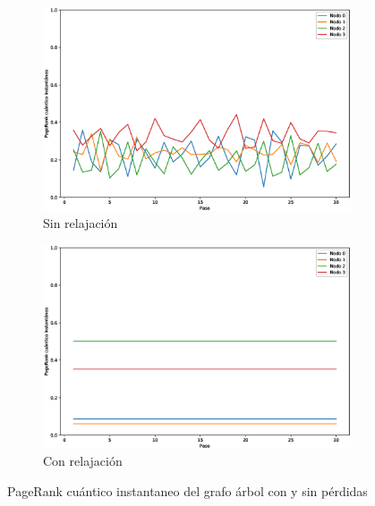 \begin{figure}[H]
    \centering
    \begin{subfigure}[m]{0.45\textwidth}
        \centering
        \includegraphics[width=0.9\linewidth]{img/tree-inst-lossless.eps}
        \caption{Sin relajación}
    \end{subfigure}
    \begin{subfigure}[m]{0.45\textwidth}
        \centering
        \includegraphics[width=0.9\linewidth]{img/tree-inst-lossy.eps}
        \caption{Con relajación}
    \end{subfigure}
    \caption[PageRank cuántico instantaneo del grafo árbol con y sin pérdidas]{PageRank cuántico instantaneo del grafo árbol con y sin pérdidas}
    \label{fig:insttreelossy}
\end{figure}

